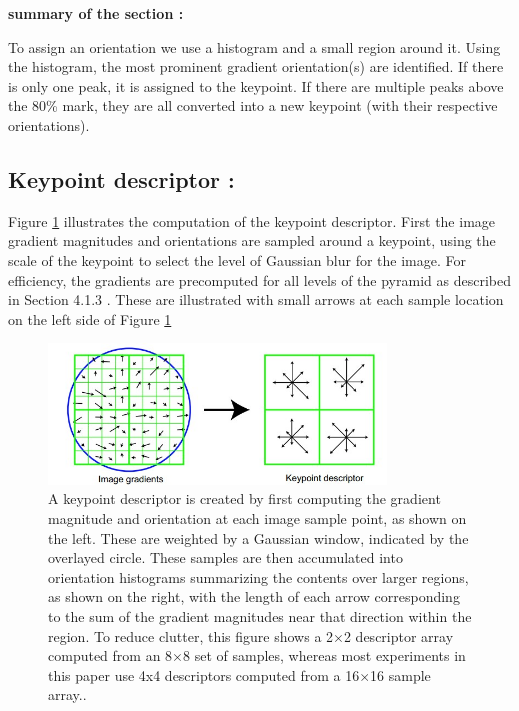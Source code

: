 \textbf{summary of the section :}

To assign an orientation we use a histogram and a small region around it. Using the histogram, the most prominent gradient orientation(s) are identified. If there is only one peak, it is assigned to the keypoint. If there are multiple peaks above the 80\% mark, they are all converted into a new keypoint (with their respective orientations).

\subsection{Keypoint descriptor :}

Figure \ref{fig:sift4} illustrates the computation of the keypoint descriptor. First the image gradient
magnitudes and orientations are sampled around a keypoint, using the scale of the keypoint
to select the level of Gaussian blur for the image. For efficiency, the gradients are precomputed
for all levels of the pyramid as described in Section 4.1.3 . These are illustrated with
small arrows at each sample location on the left side of Figure \ref{fig:sift4}

\begin{figure}[H]
\centering
\includegraphics[width=0.8\textwidth]{img/sift4.jpg}
\caption{ A keypoint descriptor is created by first computing the gradient magnitude and orientation
at each image sample point, as shown on the left. These are weighted by a Gaussian window,
indicated by the overlayed circle. These samples are then accumulated into orientation histograms
summarizing the contents over larger regions, as shown on the right, with the length of each arrow
corresponding to the sum of the gradient magnitudes near that direction within the region. To reduce
clutter, this figure shows a 2$\times$2 descriptor array computed from an 8$\times$8 set of samples, whereas most
experiments in this paper use 4x4 descriptors computed from a 16$\times$16 sample array..}
\label{fig:sift4}
\end{figure}

